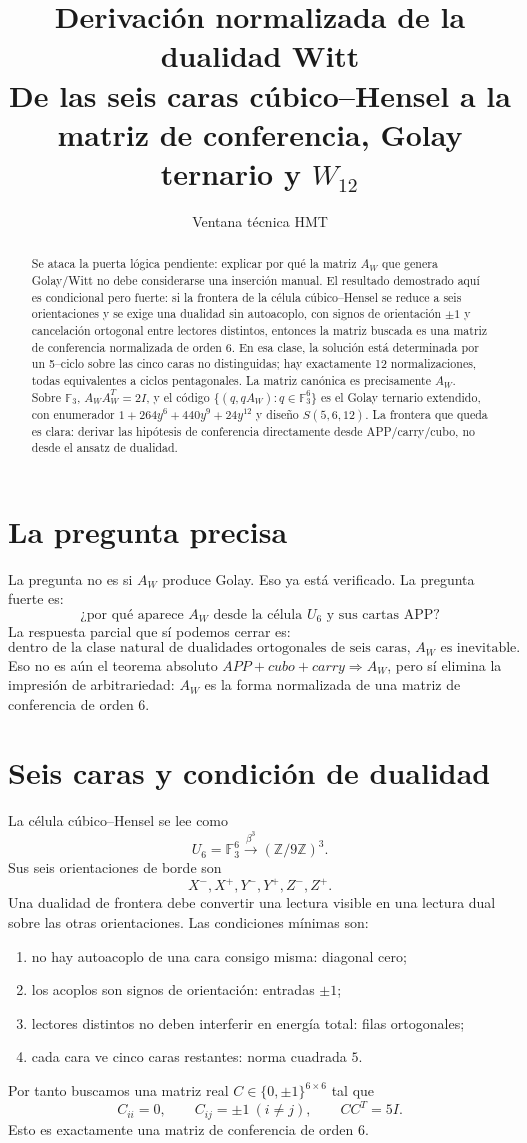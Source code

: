 \documentclass[11pt,a4paper]{article}
\title{\bfseries Derivación normalizada de la dualidad Witt\\
\large De las seis caras cúbico--Hensel a la matriz de conferencia, Golay ternario y \(W_{12}\)}
\author{Ventana técnica HMT}
\date{}
\newcommand{\F}{\mathbb F}
\newcommand{\Z}{\mathbb Z}
\begin{document}
\maketitle
\begin{abstract}
Se ataca la puerta lógica pendiente: explicar por qué la matriz \(A_W\) que genera Golay/Witt no debe considerarse una inserción manual. El resultado demostrado aquí es condicional pero fuerte: si la frontera de la célula cúbico--Hensel se reduce a seis orientaciones y se exige una dualidad sin autoacoplo, con signos de orientación \(\pm1\) y cancelación ortogonal entre lectores distintos, entonces la matriz buscada es una matriz de conferencia normalizada de orden 6. En esa clase, la solución está determinada por un 5--ciclo sobre las cinco caras no distinguidas; hay exactamente 12 normalizaciones, todas equivalentes a ciclos pentagonales. La matriz canónica es precisamente \(A_W\). Sobre \(\F_3\), \(A_WA_W^T=2I\), y el código \(\{(q,qA_W):q\in\F_3^6\}\) es el Golay ternario extendido, con enumerador \(1+264y^6+440y^9+24y^{12}\) y diseño \(S(5,6,12)\). La frontera que queda es clara: derivar las hipótesis de conferencia directamente desde APP/carry/cubo, no desde el ansatz de dualidad.
\end{abstract}

\section{La pregunta precisa}
La pregunta no es si \(A_W\) produce Golay. Eso ya está verificado. La pregunta fuerte es:
\[
\boxed{\text{¿por qué aparece }A_W\text{ desde la célula }U_6\text{ y sus cartas APP?}}
\]
La respuesta parcial que sí podemos cerrar es:
\[
\boxed{\text{dentro de la clase natural de dualidades ortogonales de seis caras, }A_W\text{ es inevitable.}}
\]
Eso no es aún el teorema absoluto \(APP+cubo+carry\Rightarrow A_W\), pero sí elimina la impresión de arbitrariedad: \(A_W\) es la forma normalizada de una matriz de conferencia de orden 6.

\section{Seis caras y condición de dualidad}
La célula cúbico--Hensel se lee como
\[
U_6=\F_3^6\xrightarrow{\beta^3}(\Z/9\Z)^3.
\]
Sus seis orientaciones de borde son
\[
X^-,X^+,Y^-,Y^+,Z^-,Z^+.
\]
Una dualidad de frontera debe convertir una lectura visible en una lectura dual sobre las otras orientaciones. Las condiciones mínimas son:
\begin{enumerate}[leftmargin=2em]
\item no hay autoacoplo de una cara consigo misma: diagonal cero;
\item los acoplos son signos de orientación: entradas \(\pm1\);
\item lectores distintos no deben interferir en energía total: filas ortogonales;
\item cada cara ve cinco caras restantes: norma cuadrada \(5\).
\end{enumerate}
Por tanto buscamos una matriz real \(C\in\{0,\pm1\}^{6\times6}\) tal que
\[
C_{ii}=0,
\qquad
C_{ij}=\pm1\ (i\ne j),
\qquad
CC^T=5I.
\]
Esto es exactamente una matriz de conferencia de orden 6.
\end{document}
